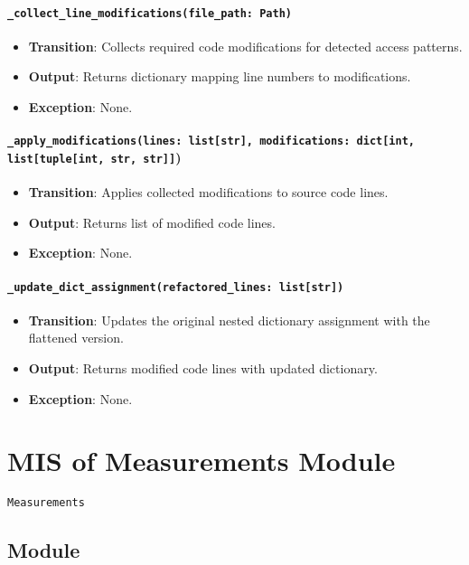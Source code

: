 \documentclass[12pt, titlepage]{article}
\begin{document}
\paragraph{\texttt{\_collect\_line\_modifications(file\_path: Path)}}
\begin{itemize}
\item \textbf{Transition}: Collects required code modifications for detected access patterns.
\item \textbf{Output}: Returns dictionary mapping line numbers to modifications.
\item \textbf{Exception}: None.
\end{itemize}

\paragraph{\texttt{\_apply\_modifications(lines: list[str], modifications: dict[int, list[tuple[int, str, str]]})}
\begin{itemize}
\item \textbf{Transition}: Applies collected modifications to source code lines.
\item \textbf{Output}: Returns list of modified code lines.
\item \textbf{Exception}: None.
\end{itemize}

\paragraph{\texttt{\_update\_dict\_assignment(refactored\_lines: list[str])}}
\begin{itemize}
\item \textbf{Transition}: Updates the original nested dictionary assignment with the flattened version.
\item \textbf{Output}: Returns modified code lines with updated dictionary.
\item \textbf{Exception}: None.
\end{itemize}

\section{MIS of Measurements Module} \label{mis:measure}

\texttt{Measurements}

\subsection{Module}
\end{document}

